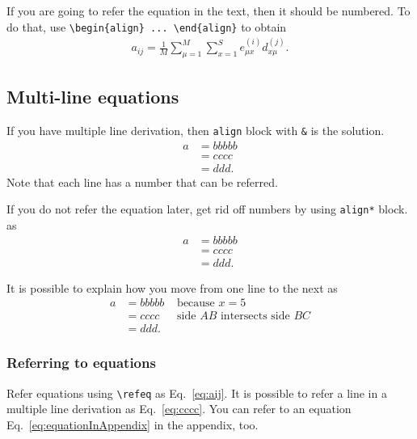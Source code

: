 \documentclass[pre,twocolumn,showkeys,longbibliography]{revtex4-1}
\newcommand{\refeq}[1]{Eq.~\ref{#1}}
\newcommand{\hCode}[1]{\texttt{#1}}
\theoremstyle{plain}
\theoremstyle{definition}
\theoremstyle{remark}
\begin{document}
If you are going to refer the equation in the text,
then it should be numbered.
To do that,
use \verb!\begin{align} ... \end{align}! to obtain
\begin{align}
	a_{ij} =
		\frac{1}{M}
		\sum_{\mu = 1}^{M} 
		{\sum_{x = 1}^{S} 
			e_{\mu x}^{(i)}
			d_{x \mu}^{(j)} }.
	\label{eq:aij}
\end{align}




\subsection{Multi-line equations}

If you have multiple line derivation,
then \hCode{align} block with \verb!&! is the solution.
\begin{align}
	a 
	&= bbbbb\\
	&= cccc \label{eq:cccc}\\
	&= ddd.
\end{align}
Note that each line has a number that can be referred.

If you do not refer the equation later,
get rid off numbers by using \hCode{align*} block.
as
\begin{align*}
	a 
	&= bbbbb\\
	&= cccc\\
	&= ddd.
\end{align*}

It is possible to explain how you move from one line to the next as 
\begin{align*}
	a 
	&= bbbbb
		&\text{ because } x = 5\\
	&= cccc
		&\text{ side $AB$ intersects side $BC$}\\
	&= ddd.
\end{align*}




\subsubsection{Referring to equations}

Refer equations using \verb!\refeq! as \refeq{eq:aij}.
It is possible to refer a line in a multiple line derivation as \refeq{eq:cccc}.
You can refer to an equation \refeq{eq:equationInAppendix} in the appendix, too.
\end{document}
